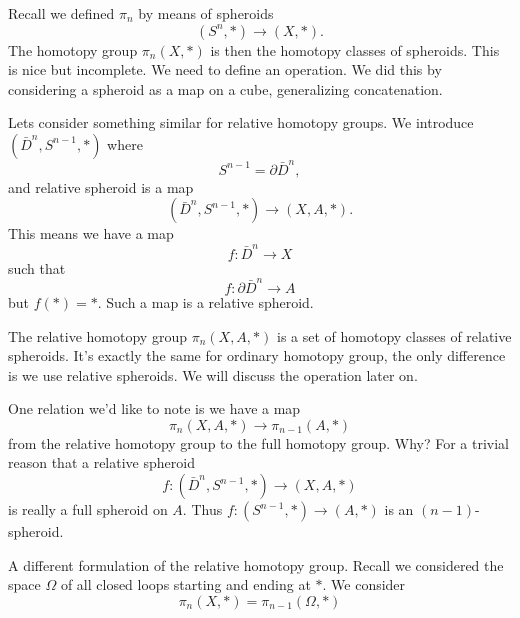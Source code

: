 Recall we defined $\pi_n$ by means of spheroids
\begin{equation*}
(S^n,*)\to(X,*).
\end{equation*}
The homotopy group $\pi_{n}(X,*)$ is then the homotopy classes of
spheroids. This is nice but incomplete. We need to define an
operation. We did this by considering a
spheroid as a map on a
cube, generalizing
concatenation.

Lets consider something similar for relative homotopy groups. We
introduce  %
$(\bar{D}^n,S^{n-1},*)$ where 
\begin{equation}
S^{n-1}=\partial\bar{D}^{n},
\end{equation}
and relative spheroid is a map
\begin{equation}
(\bar{D}^n,S^{n-1},*)\to(X,A,*).
\end{equation}
This means we have a map
\begin{equation}
f\colon\bar{D}^{n}\to X
\end{equation}
such that
\begin{equation}
f\colon\partial\bar{D}^{n}\to A
\end{equation}
but $f(*)=*$. Such a map is a relative spheroid.

The relative homotopy group $\pi_{n}(X,A,*)$
is a set of homotopy classes of relative spheroids. It's exactly
the same for ordinary homotopy group, the only difference is we
use relative spheroids. We will discuss the operation later on.

One relation we'd like to note is we have a map
\begin{equation}
\pi_{n}(X,A,*)\to\pi_{n-1}(A,*)
\end{equation}
from the relative homotopy group to the full homotopy group. Why?
For a trivial reason that a relative spheroid
\begin{equation}
f\colon(\bar{D}^{n},S^{n-1},*)\to(X,A,*)
\end{equation}
is really a full spheroid on $A$. Thus $f\colon(S^{n-1},*)\to(A,*)$
is an $(n-1)$-spheroid.

A different formulation of the relative homotopy group.
Recall we considered the space $\Omega$ of all closed loops
starting and ending at $*$. We consider 
\begin{equation*}
\pi_{n}(X,*)=\pi_{n-1}(\Omega,*)
\end{equation*}

